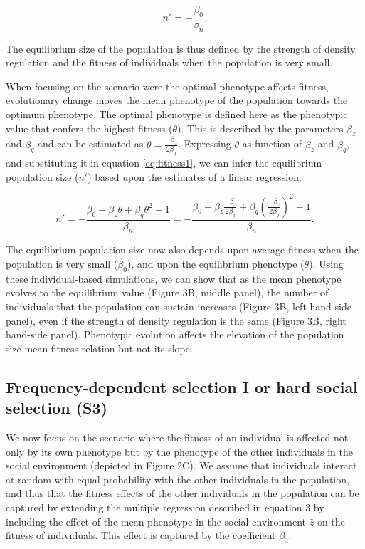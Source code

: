 \documentclass{article}
\begin{document}
\begin{equation}\label{eq:equilibriumN}
n'=-\frac{\beta_{0}}{\beta_n}. 
\end{equation} 

The equilibrium size of the population is thus defined by the strength of density regulation and the fitness of individuals when the population is very small. 

When focusing on the scenario were the optimal phenotype affects fitness, evolutionary change moves the mean phenotype of the population towards the optimum phenotype. The optimal phenotype is defined here as the phenotypic value that confers the highest fitness ($\theta$). This is described by the parameters $\beta_{z}$ and $\beta_{q}$ and can be estimated as $\theta=\frac{-\beta_{z}}{2\beta_{q}}$. Expressing $\theta$ as function of $\beta_{z}$ and $\beta_{q}$, and substituting it in equation \ref{eq:fitness1}, we can infer the equilibrium population size ($n'$) based upon the estimates of a linear regression:

\begin{equation}\label{eq:equilibrium1}
n'=-\frac{\beta_{0}+ \beta_{z}\theta + \beta_{q}\theta^2-1}{\beta_n} = -\frac{\beta_{0}+ \beta_{z}\frac{-\beta_{z}}{2\beta_{q}} + \beta_{q}(\frac{-\beta_{z}}{2\beta_{q}})^2-1}{\beta_n}. 
\end{equation}

 The equilibrium population size now also depends upon average fitness when the population is very small ($\beta_0$), and upon the equilibrium phenotype ($\theta$). Using these individual-based simulations, we can show that as the mean phenotype evolves to the equilibrium value (Figure 3B, middle panel), the number of individuals that the population can sustain increases (Figure 3B, left hand-side panel), even if the strength of density regulation is the same (Figure 3B, right hand-side panel). Phenotypic evolution affects the elevation of the population size-mean fitness relation but not its slope.

\subsection{Frequency-dependent selection I or hard social selection (S3)}

We now focus on the scenario where the fitness of an individual is affected not only by its own phenotype but by the phenotype of the other individuals in the social environment (depicted in Figure 2C). We assume that individuals interact at random with equal probability with the other individuals in the population, and thus that the fitness effects of the other individuals in the population can be captured by extending the multiple regression described in equation 3 by including the effect of the mean phenotype in the social environment $\bar{z}$ on the fitness of individuals. This effect is captured by the coefficient $\beta_{\bar{z}}$:  
\end{document}
